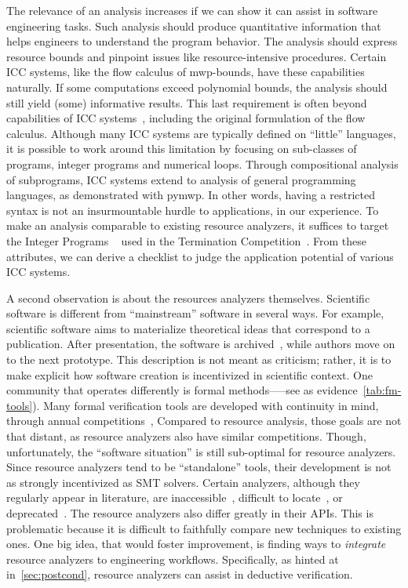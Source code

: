 The relevance of an analysis increases if we can show it can assist in software engineering tasks.
Such analysis should produce quantitative information that helps engineers to understand the program behavior.
The analysis should express resource bounds and pinpoint issues like resource-intensive procedures.
Certain ICC systems, like the flow calculus of mwp-bounds, have these capabilities naturally.
If some computations exceed polynomial bounds, the analysis should still yield (some) informative results.
This last requirement is often beyond capabilities of ICC systems~\cite{baillot2012}, including the original formulation of the flow calculus.
Although many ICC systems are typically defined on \enquote{little} languages, it is possible to work around this limitation by focusing on sub-classes of programs, \eg integer programs and numerical loops.
Through compositional analysis of subprograms, ICC systems extend to analysis of general programming languages, as demonstrated with pymwp.
In other words, having a restricted syntax is not an insurmountable hurdle to applications, in our experience.
To make an analysis comparable to existing resource analyzers, it suffices to target the  Integer Programs ~\cite{cinteger} used in the Termination Competition~\cite{giesl2019}.
From these attributes, we can derive a checklist to judge the application potential of various ICC systems.

A second observation is about the resources analyzers themselves.
Scientific software is different from \enquote{mainstream} software in several ways.
For example, scientific software aims to materialize theoretical ideas that correspond to a publication.
After presentation, the software is archived~\cite{acm_badging}, while authors move on to the next prototype.
This description is not meant as criticism;
rather, it is to make explicit how software creation is incentivized in scientific context.
One community that operates differently is formal methods—--see as evidence~\autoref{tab:fm-tools}).
Many formal verification tools are developed with continuity in mind, through annual competitions~\cite{casc,beyer2022}, \etc
Compared to resource analysis, those goals are not that distant, as resource analyzers also have similar competitions.
Though, unfortunately, the \enquote{software situation} is still sub-optimal for resource analyzers.
Since resource analyzers tend to be \enquote{standalone} tools, their development is not as strongly incentivized as \eg SMT solvers.
Certain analyzers, although they regularly appear in literature, are inaccessible~\cite{sinn2017}, difficult to locate~\cite{carbonneaux2015},
or deprecated~\cite{gulwani2009,srikanth2017}.
The resource analyzers also differ greatly in their APIs.
This is problematic because it is difficult to faithfully compare new techniques to existing ones.
One big idea, that would foster improvement, is finding ways to \emph{integrate} resource analyzers to engineering workflows.
Specifically, as hinted at in~\autoref{sec:postcond}, resource analyzers can assist in deductive verification.

